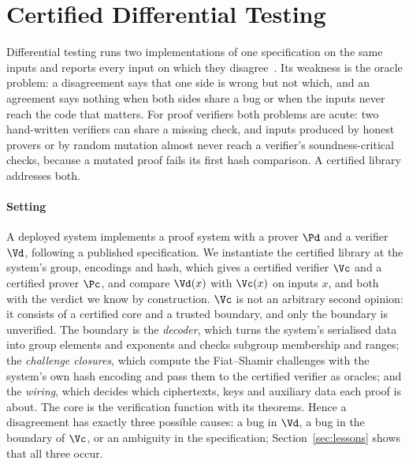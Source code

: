 \section{Certified Differential Testing}\label{sec:difftest}
Differential testing runs two implementations of one specification on the
same inputs and reports every input on which they
disagree~\cite{mckeeman1998differential,yang2011csmith}. Its weakness is the
oracle problem: a disagreement says that one side is wrong but not which,
and an agreement says nothing when both sides share a bug or when the inputs
never reach the code that matters. For proof verifiers both problems are
acute: two hand-written verifiers can share a missing check, and inputs
produced by honest provers or by random mutation almost never reach a
verifier's soundness-critical checks, because a mutated proof fails its
first hash comparison. A certified library addresses both.

\paragraph{Setting}
A deployed system implements a proof system with a prover $\Pd$ and a
verifier $\Vd$, following a published specification. We instantiate the
certified library at the system's group, encodings and hash, which gives a
certified verifier $\Vc$ and a certified prover $\Pc$, and compare
$\Vd(x)$ with $\Vc(x)$ on inputs $x$, and both with the verdict we know by
construction. $\Vc$ is not an arbitrary second opinion: it consists of a
certified core and a trusted boundary, and only the boundary is
unverified. The boundary is the \emph{decoder}, which turns the system's
serialised data into group elements and exponents and checks subgroup
membership and ranges; the \emph{challenge closures}, which compute the
Fiat--Shamir challenges with the system's own hash encoding and pass them
to the certified verifier as oracles; and the \emph{wiring}, which decides
which ciphertexts, keys and auxiliary data each proof is about. The core
is the verification function with its theorems. Hence a disagreement has
exactly three possible causes: a bug in $\Vd$, a bug in the boundary of
$\Vc$, or an ambiguity in the specification; Section~\ref{sec:lessons}
shows that all three occur.

